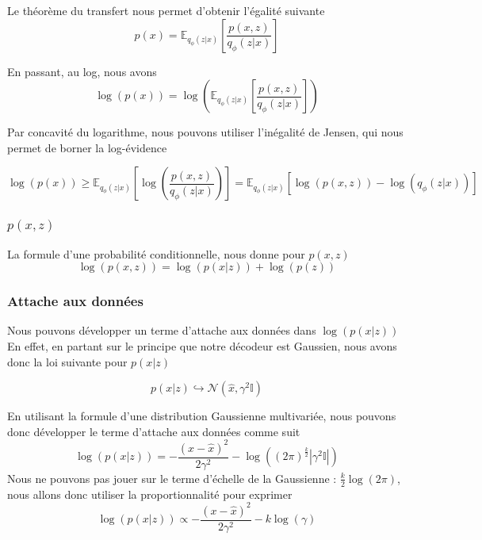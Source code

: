 \documentclass{article}
\begin{document}
Le théorème du transfert nous permet d'obtenir l'égalité suivante
\begin{equation}
    p(x) = \mathbb{E}_{q_\phi(z|x)}[\frac{p(x,z)}{q_\phi(z|x)}]
\end{equation}

En passant, au log, nous avons 
\begin{equation*}
    \log(p(x)) = \log(\mathbb{E}_{q_\phi(z|x)}[\frac{p(x,z)}{q_\phi(z|x)}])
\end{equation*}

Par concavité du logarithme, nous pouvons utiliser l'inégalité de Jensen, qui nous permet de borner la log-évidence

\begin{equation}
    \log(p(x)) \geq \mathbb{E}_{q_\phi(z|x)}[\log(\frac{p(x,z)}{q_\phi(z|x)})] = \mathbb{E}_{q_\phi(z|x)}[\log(p(x,z)) - \log(q_\phi(z|x))] 
\end{equation}

\subsubsection{$p(x,z)$}

La formule d'une probabilité conditionnelle, nous donne pour $p(x,z)$
\begin{equation*}
    \log(p(x,z)) = \log(p(x|z)) + \log(p(z))
\end{equation*}

\subsubsection{Attache aux données}

Nous pouvons développer un terme d'attache aux données dans $\log(p(x|z))$
En effet, en partant sur le principe que notre décodeur est Gaussien, nous avons donc la loi suivante pour $p(x|z)$

\begin{equation*}
    p(x|z) \hookrightarrow \mathcal{N}(\hat{x}, \gamma^2\mathbb{I})
\end{equation*}

En utilisant la formule d'une distribution Gaussienne multivariée, nous pouvons donc développer le terme d'attache aux données comme suit 
\begin{equation*}
    \log(p(x|z)) = -\frac{(x-\hat{x})^2}{2\gamma^2} - \log((2\pi)^{\frac{k}{2}} |\gamma^2\mathbb{I}|) 
\end{equation*}
Nous ne pouvons pas jouer sur le terme d'échelle de la Gaussienne : $\frac{k}{2}\log(2\pi)$, nous allons donc utiliser la proportionnalité pour exprimer 
\begin{equation}
    \log(p(x|z)) \propto -\frac{(x-\hat{x})^2}{2\gamma^2} - k\log(\gamma) 
\end{equation}
\end{document}
